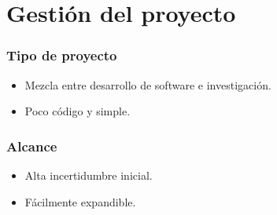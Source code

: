 \documentclass[a4paper,10pt]{beamer}
\begin{document}




\section{Gestión del proyecto}
\begin{frame}[fragile]
	\frametitle{Tipo de proyecto}

	\begin{itemize}
		\item Mezcla entre desarrollo de software e investigación. %
		\item Poco código y simple.
	\end{itemize}
\end{frame}

\begin{frame}[fragile]
	\frametitle{Alcance}

	\begin{itemize}
		\item Alta incertidumbre inicial.
		\item Fácilmente expandible. %
	\end{itemize}
\end{frame}
\end{document}
